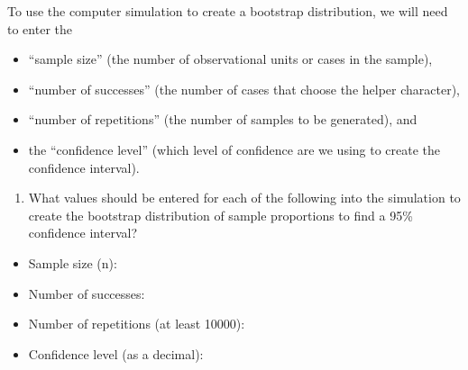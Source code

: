 \documentclass[
]{report}
\providecommand{\tightlist}{%
  \setlength{\itemsep}{0pt}\setlength{\parskip}{0pt}}
\begin{document}
\vspace{0.3in}

To use the computer simulation to create a bootstrap distribution, we will need to enter the

\begin{itemize}
\tightlist
\item
  ``sample size'' (the number of observational units or cases in the sample),
\item
  ``number of successes'' (the number of cases that choose the helper character),
\item
  ``number of repetitions'' (the number of samples to be generated), and
\item
  the ``confidence level'' (which level of confidence are we using to create the confidence interval).
\end{itemize}

\begin{enumerate}
\def\labelenumi{\arabic{enumi}.}
\setcounter{enumi}{5}
\tightlist
\item
  What values should be entered for each of the following into the simulation to create the bootstrap distribution of sample proportions to find a 95\% confidence interval?
  \vspace{1mm}
\end{enumerate}

\begin{itemize}
\tightlist
\item
  Sample size (n):
\end{itemize}

\vspace{.1in}

\begin{itemize}
\tightlist
\item
  Number of successes:
\end{itemize}

\vspace{.1in}

\begin{itemize}
\tightlist
\item
  Number of repetitions (at least 10000):
\end{itemize}

\vspace{.1in}

\begin{itemize}
\tightlist
\item
  Confidence level (as a decimal):
\end{itemize}
\end{document}
